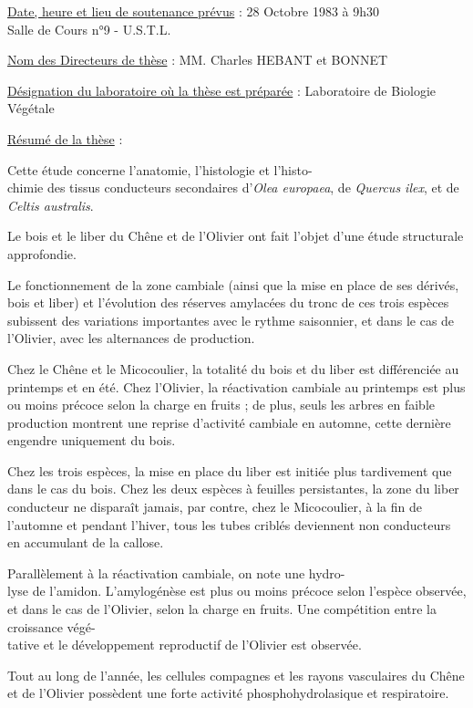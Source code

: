 \uline{Date, heure et lieu de soutenance prévus} : 28 Octobre 1983 à 9h30\\
Salle de Cours n°9 - U.S.T.L.

\uline{Nom des Directeurs de thèse} : MM. Charles HEBANT et BONNET

\uline{Désignation du laboratoire où la thèse est préparée} : Laboratoire de Biologie Végétale

\uline{Résumé de la thèse} :

Cette étude concerne l'anatomie, l'histologie et l'histo-\\
chimie des tissus conducteurs secondaires d'\textit{Olea europaea}, de \textit{Quercus ilex}, et de \textit{Celtis australis}.

Le bois et le liber du Chêne et de l'Olivier ont fait l'objet d'une étude structurale approfondie.

Le fonctionnement de la zone cambiale (ainsi que la mise en place de ses dérivés, bois et liber) et l'évolution des réserves amylacées du tronc de ces trois espèces subissent des variations importantes avec le rythme saisonnier, et dans le cas de l'Olivier, avec les alternances de production.

Chez le Chêne et le Micocoulier, la totalité du bois et du liber est différenciée au printemps et en été. Chez l'Olivier, la réactivation cambiale au printemps est plus ou moins précoce selon la charge en fruits ; de plus, seuls les arbres en faible production montrent une reprise d'activité cambiale en automne, cette dernière engendre uniquement du bois.

Chez les trois espèces, la mise en place du liber est initiée plus tardivement que dans le cas du bois. Chez les deux espèces à feuilles persistantes, la zone du liber conducteur ne disparaît jamais, par contre, chez le Micocoulier, à la fin de l'automne et pendant l'hiver, tous les tubes criblés deviennent non conducteurs en accumulant de la callose.

Parallèlement à la réactivation cambiale, on note une hydro-\\
lyse de l'amidon. L'amylogénèse est plus ou moins précoce selon l'espèce observée, et dans le cas de l'Olivier, selon la charge en fruits. Une compétition entre la croissance végé-\\
tative et le développement reproductif de l'Olivier est observée.

Tout au long de l'année, les cellules compagnes et les rayons vasculaires du Chêne et de l'Olivier possèdent une forte activité phosphohydrolasique et respiratoire.


